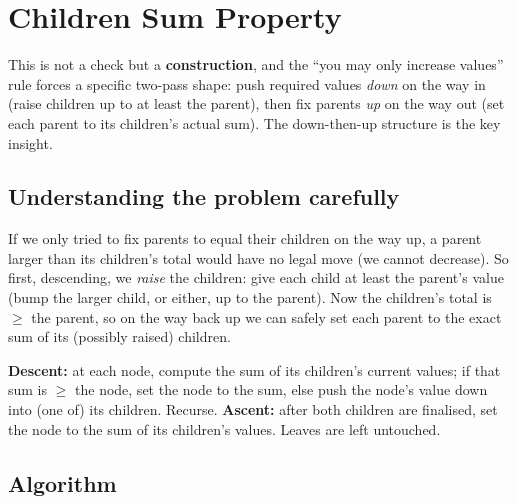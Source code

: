 \section{Children Sum Property}
\label{sec:trees-children-sum}


\begin{patternbox}
This is not a check but a \textbf{construction}, and the ``you may only
increase values'' rule forces a specific two-pass shape: push required
values \emph{down} on the way in (raise children up to at least the
parent), then fix parents \emph{up} on the way out (set each parent to its
children's actual sum). The down-then-up structure is the key insight.
\end{patternbox}

\subsection*{Understanding the problem carefully}

If we only tried to fix parents to equal their children on the way up, a
parent larger than its children's total would have no legal move (we cannot
decrease). So first, descending, we \emph{raise} the children: give each
child at least the parent's value (bump the larger child, or either, up to
the parent). Now the children's total is $\ge$ the parent, so on the way
back up we can safely set each parent to the exact sum of its (possibly
raised) children.

\begin{ideabox}
\textbf{Descent:} at each node, compute the sum of its children's current
values; if that sum is $\ge$ the node, set the node to the sum, else push
the node's value down into (one of) its children. Recurse.
\textbf{Ascent:} after both children are finalised, set the node to the sum
of its children's values. Leaves are left untouched.
\end{ideabox}

\subsection*{Algorithm}

